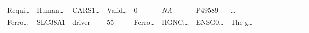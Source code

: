 \documentclass[
]{article}
\begin{document}
\begin{longtable}[]{@{}lllllllllllllll@{}}
\begin{minipage}[t]{0.05\columnwidth}
Requi\ldots{}\strut
\end{minipage} & \begin{minipage}[t]{0.05\columnwidth}\raggedright
Human\ldots{}\strut
\end{minipage} & \begin{minipage}[t]{0.05\columnwidth}\raggedright
CARS1\ldots{}\strut
\end{minipage} & \begin{minipage}[t]{0.05\columnwidth}\raggedright
Valid\ldots{}\strut
\end{minipage} & \begin{minipage}[t]{0.05\columnwidth}\raggedright
0\strut
\end{minipage} & \begin{minipage}[t]{0.05\columnwidth}\raggedright
\emph{NA}\strut
\end{minipage} & \begin{minipage}[t]{0.05\columnwidth}\raggedright
P49589\strut
\end{minipage} & \begin{minipage}[t]{0.02\columnwidth}\raggedright
\ldots{}\strut
\end{minipage}\tabularnewline
\begin{minipage}[t]{0.05\columnwidth}\raggedright
Ferro\ldots{}\strut
\end{minipage} & \begin{minipage}[t]{0.05\columnwidth}\raggedright
SLC38A1\strut
\end{minipage} & \begin{minipage}[t]{0.04\columnwidth}\raggedright
driver\strut
\end{minipage} & \begin{minipage}[t]{0.02\columnwidth}\raggedright
55\strut
\end{minipage} & \begin{minipage}[t]{0.05\columnwidth}\raggedright
Ferro\ldots{}\strut
\end{minipage} & \begin{minipage}[t]{0.05\columnwidth}\raggedright
HGNC:\ldots{}\strut
\end{minipage} & \begin{minipage}[t]{0.05\columnwidth}\raggedright
ENSG0\ldots{}\strut
\end{minipage} & \begin{minipage}[t]{0.05\columnwidth}\raggedright
The g\ldots{}\strut
\end{minipage} & \begin{minipage}[t]{0.05\columnwidth}\raggedright

\end{minipage}
\end{longtable}
\end{document}
